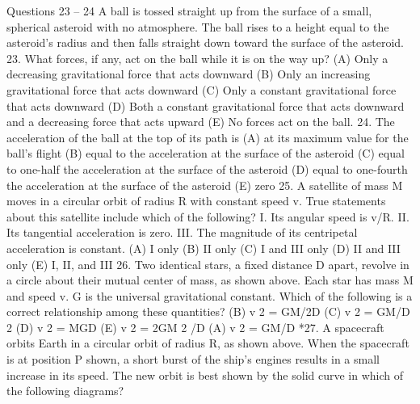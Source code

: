 Questions 23 – 24
A ball is tossed straight up from the surface of a small, spherical asteroid with no atmosphere. The ball rises to a
height equal to the asteroid's radius and then falls straight down toward the surface of the asteroid.
23. What forces, if any, act on the ball while it is on the way up?
(A) Only a decreasing gravitational force that acts downward
(B) Only an increasing gravitational force that acts downward
(C) Only a constant gravitational force that acts downward
(D) Both a constant gravitational force that acts downward and a decreasing force that acts upward
(E) No forces act on the ball.
24. The acceleration of the ball at the top of its path is
(A) at its maximum value for the ball's flight
(B) equal to the acceleration at the surface of the asteroid
(C) equal to one-half the acceleration at the surface of the asteroid
(D) equal to one-fourth the acceleration at the surface of the asteroid
(E) zero
25. A satellite of mass M moves in a circular orbit of radius R with constant speed v. True statements about this
satellite include which of the following?
I. Its angular speed is v/R.
II. Its tangential acceleration is zero.
III. The magnitude of its centripetal acceleration is constant.
(A) I only
(B) II only
(C) I and III only
(D) II and III only
(E) I, II, and III
26. Two identical stars, a fixed distance D apart, revolve in a circle about their mutual center of mass, as shown
above. Each star has mass M and speed v. G is the universal gravitational constant. Which of the following is
a correct relationship among these quantities?
(B) v 2 = GM/2D
(C) v 2 = GM/D 2
(D) v 2 = MGD
(E) v 2 = 2GM 2 /D
(A) v 2 = GM/D
*27. A spacecraft orbits Earth in a circular orbit of radius R, as shown above. When the spacecraft is at position P
shown, a short burst of the ship's engines results in a small increase in its speed. The new orbit is best shown by
the solid curve in which of the following diagrams?





